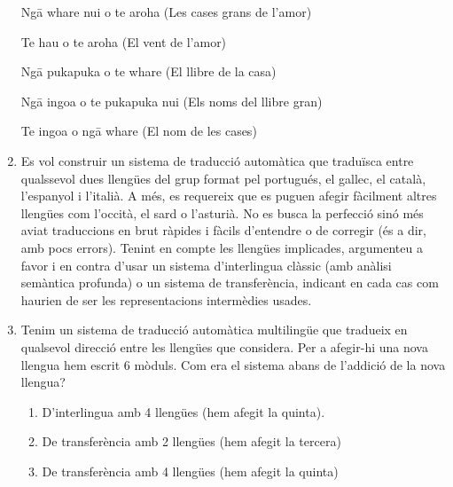 \begin{enumerate}
     \begin{example}
       Ng\={a} whare nui o te aroha (Les cases grans de l'amor)
     \end{example}
     \begin{example}
       Te hau o te aroha (El vent de l'amor)
     \end{example}
     \begin{example}
       Ng\={a} pukapuka o te whare (El llibre de la casa)
     \end{example}
     \begin{example}
       Ng\={a} ingoa o te pukapuka nui (Els noms del llibre gran)
     \end{example}
     \begin{example}
       Te ingoa o ng\={a} whare (El nom de les cases)
     \end{example}
     
   \item Es vol construir un sistema de traducció automàtica que
     traduïsca entre qualssevol dues llengües del grup format pel
     portugués, el gallec, el català, l'espanyol i l'italià. A més, es
     requereix que es puguen afegir fàcilment altres llengües com
     l'occità, el sard o l'asturià. No es busca la perfecció sinó més
     aviat traduccions en brut ràpides i fàcils d'entendre o de
     corregir (és a dir, amb pocs errors). Tenint en compte les
     llengües implicades, argumenteu a favor i en contra d'usar un
     sistema d'interlingua clàssic (amb anàlisi semàntica profunda) o
     un sistema de transferència, indicant en cada cas com haurien de
     ser les representacions intermèdies usades.

\item Tenim un sistema de traducció automàtica multilingüe que
   tradueix en qualsevol direcció entre les llengües que
   considera. Per a afegir-hi una nova llengua hem escrit 6
   mòduls. Com era el sistema abans de l'addició de la nova llengua?
   
\begin{enumerate}
\item D'interlingua amb 4 llengües (hem afegit la quinta).
\item De transferència amb 2 llengües (hem afegit la tercera)
\item De transferència amb 4 llengües (hem afegit la quinta)
\end{enumerate}


\end{enumerate}
